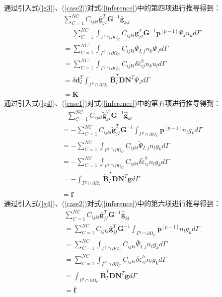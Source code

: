 通过引入式(\ref{g3})、(\ref{case2})对式(\ref{inference})中的第四项进行推导得到：
\begin{equation}\label{CH4-barK}
\begin{split}
    &\sum_{C=1}^{N\!C}C_{ijkl}\bar{\pmb g}^T_{jI}\pmb{G}^{-1}\bar{\pmb g}_{kJ}\\
    &=\sum_{C=1}^{N\!C}\int_{\Gamma^g\cap\partial\Omega_C}C_{ijkl}\bar{\pmb g}_{jI}^T\pmb{G}^{-1}\pmb{p}^{[p-1]}\Psi_Jn_kd\Gamma\\
    &=\sum_{C=1}^{N\!C}\int_{\Gamma^g\cap\partial\Omega_C}C_{ijkl}\bar{\Psi}_{I,j}n_k\Psi_{J}d\Gamma\\
    &=\sum_{C=1}^{N\!C}\int_{\Gamma^g\cap\partial\Omega_C}C_{ijkl}\delta\bar{\varepsilon}_{ij}^hn_ku_ld\Gamma\\
    &=\delta\pmb{d}_I^T\int_{\Gamma^g\cap\partial\Omega_C}\bar{\pmb{B}}_I^T\pmb{D}\pmb{N}^T\Psi_Jd\Gamma\\
    &=\bar{\pmb{K}}
\end{split}
\end{equation}
通过引入式(\ref{g4})、(\ref{case1})对式(\ref{inference})中的第五项进行推导得到：
\begin{equation}\label{CH4-tildef}
\begin{split}
    &-\sum_{C=1}^{N\!C}C_{ijkl}\tilde{\pmb g}^T_{jI}\pmb{G}^{-1}\hat{\pmb g}_{kl}\\
    &=-\sum_{C=1}^{N\!C}C_{ijkl}\tilde{\pmb g}^T_{jI}\pmb{G}^{-1}\int_{\Gamma^g\cap\partial\Omega_C}\pmb{p}^{[p-1]}n_lg_kd\Gamma\\
    &=-\sum_{C=1}^{N\!C}\int_{\Gamma^g\cap\partial\Omega_C}C_{ijkl}\tilde{\Psi}_{I,j}n_lg_kd\Gamma\\
    &=-\sum_{C=1}^{N\!C}\int_{\Gamma^g\cap\partial\Omega_C}C_{ijkl}\delta\tilde{\varepsilon}_{ij}^hn_lg_kd\Gamma\\
    &=-\int_{\Gamma^g\cap\partial\Omega_C}\tilde{\pmb{B}}_I^T\pmb{D}\pmb{N}^T\pmb{g}d\Gamma\\
    &=\tilde{\pmb f}
\end{split}
\end{equation}
通过引入式(\ref{g4})、(\ref{case2})对式(\ref{inference})中的第六项进行推导得到：
\begin{equation}\label{CH4-barf}
\begin{split}
    &\sum_{C=1}^{N\!C}C_{ijkl}\bar{\pmb g}^T_{jI}\pmb{G}^{-1}\hat{\pmb g}_{kl}\\
    &=\sum_{C=1}^{N\!C}C_{ijkl}\bar{\pmb g}^T_{jI}\pmb{G}^{-1}\int_{\Gamma^g\cap\partial\Omega_C}\pmb{p}^{[p-1]}n_lg_kd\Gamma\\
    &=\sum_{C=1}^{N\!C}\int_{\Gamma^g\cap\partial\Omega_C}C_{ijkl}\bar{\Psi}_{I,j}n_lg_kd\Gamma\\
    &=\sum_{C=1}^{N\!C}\int_{\Gamma^g\cap\partial\Omega_C}C_{ijkl}\delta\bar{\varepsilon}_{ij}^hn_lg_kd\Gamma\\
    &=\int_{\Gamma^g\cap\partial\Omega_C}\bar{\pmb{B}}_I^T\pmb{D}\pmb{N}^T\pmb{g}d\Gamma\\
    &=\bar{\pmb f}
\end{split}
\end{equation}


